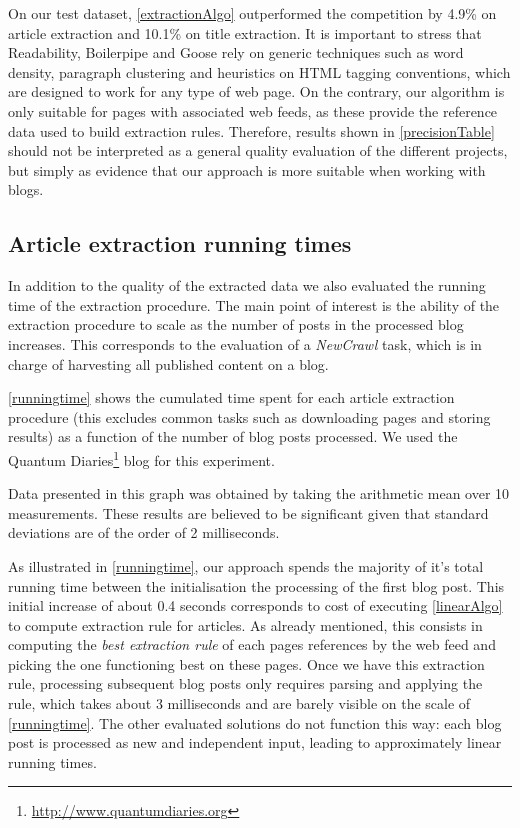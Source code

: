 \precisionTable

On our test dataset, \autoref{extractionAlgo} outperformed the competition by 4.9\% on article extraction and 10.1\% on title extraction. It is important to stress that Readability, Boilerpipe and Goose rely on generic techniques such as word density, paragraph clustering and heuristics on HTML tagging conventions, which are designed to work for any type of web page. On the contrary, our algorithm is only suitable for pages with associated web feeds, as these provide the reference data used to build extraction rules. Therefore, results shown in \autoref{precisionTable} should not be interpreted as a general quality evaluation of the different projects, but simply as evidence that our approach is more suitable when working with blogs.


\subsection{Article extraction running times}

In addition to the quality of the extracted data we also evaluated the running time of the extraction procedure. The main point of interest is the ability of the extraction procedure to scale as the number of posts in the processed blog increases. This corresponds to the evaluation of a \emph{NewCrawl} task, which is in charge of harvesting all published content on a blog.

\autoref{runningtime} shows the cumulated time spent for each article extraction procedure (this excludes common tasks such as downloading pages and storing results) as a function of the number of blog posts processed. We used the Quantum Diaries\footnote{\url{http://www.quantumdiaries.org}} blog for this experiment.

Data presented in this graph was obtained by taking the arithmetic mean over 10 measurements. These results are believed to be significant given that standard deviations are of the order of 2 milliseconds.



As illustrated in \autoref{runningtime}, our approach spends the majority of it's total running time between the initialisation the processing of the first blog post. This initial increase of about 0.4 seconds corresponds to cost of executing \autoref{linearAlgo} to compute extraction rule for articles. As already mentioned, this consists in computing the \emph{best extraction rule} of each pages references by the web feed and picking the one functioning best on these pages. Once we have this extraction rule, processing subsequent blog posts only requires parsing and applying the rule, which takes about 3 milliseconds and are barely visible on the scale of \autoref{runningtime}. The other evaluated solutions do not function this way: each blog post is processed as new and independent input, leading to approximately linear running times.

